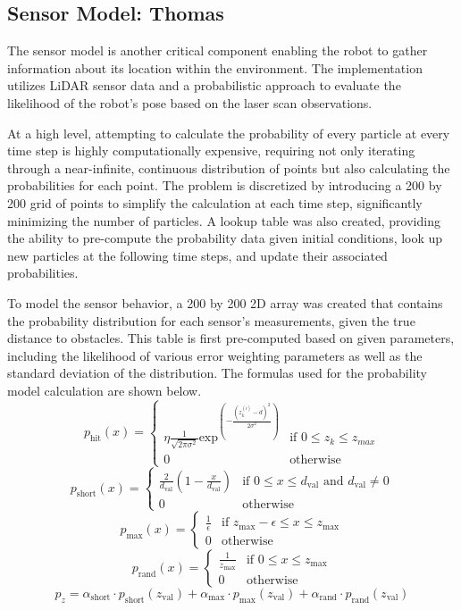 \documentclass{article}
\begin{document}
\subsection{Sensor Model: Thomas}
The sensor model is another critical component enabling the robot to gather information about its location within the environment. The implementation utilizes LiDAR sensor data and a probabilistic approach to evaluate the likelihood of the robot's pose based on the laser scan observations. 

At a high level, attempting to calculate the probability of every particle at every time step is highly computationally expensive, requiring not only iterating through a near-infinite, continuous distribution of points but also calculating the probabilities for each point. The problem is discretized by introducing a 200 by 200 grid of points to simplify the calculation at each time step, significantly minimizing the number of particles. A lookup table was also created, providing the ability to pre-compute the probability data given initial conditions, look up new particles at the following time steps, and update their associated probabilities. 

To model the sensor behavior, a 200 by 200 2D array was created that contains the probability distribution for each sensor's measurements, given the true distance to obstacles. This table is first pre-computed based on given parameters, including the likelihood of various error weighting parameters as well as the standard deviation of the distribution. The formulas used for the probability model calculation are shown below. 
$$
p_{\text{hit}}(x) = 
\begin{cases} 
\eta\frac{1}{\sqrt{2\pi\sigma^2}}\text{exp}^\left(-\frac{(z_k^{(i)}-d)^2}{2\sigma^2}\right) & \text{if } 0 \leq z_k \leq z_{max}  \\
0 & \text{otherwise}
\end{cases}
$$
$$
p_{\text{short}}(x) = 
\begin{cases} 
\frac{2}{d_{\text{val}}} \left(1 - \frac{x}{d_{\text{val}}}\right) & \text{if } 0 \leq x \leq d_{\text{val}} \text{ and } d_{\text{val}} \neq 0 \\
0 & \text{otherwise}
\end{cases}
$$
$$
p_{\text{max}}(x) = 
\begin{cases} 
\frac{1}{\epsilon} & \text{if } z_{\text{max}} - \epsilon \leq x \leq z_{\text{max}} \\
0 & \text{otherwise}
\end{cases}
$$
$$
p_{\text{rand}}(x) = 
\begin{cases} 
\frac{1}{z_{\text{max}}} & \text{if } 0 \leq x \leq z_{\text{max}} \\
0 & \text{otherwise}
\end{cases}
$$
$$
p_z = \alpha_{\text{short}} \cdot p_{\text{short}}(z_{\text{val}}) + \alpha_{\text{max}} \cdot p_{\text{max}}(z_{\text{val}}) + \alpha_{\text{rand}} \cdot p_{\text{rand}}(z_{\text{val}})
$$
\end{document}
